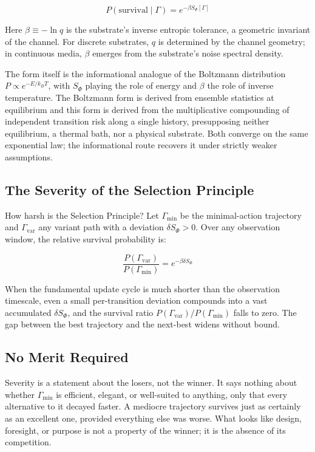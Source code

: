 \begin{equation}
\label{eq:survival_prob}
    P(\text{survival} \mid \Gamma) = e^{-\beta S_\Phi[\Gamma]}
\end{equation}

Here $\beta \equiv -\ln q$ is the substrate's inverse entropic tolerance, a geometric invariant of the channel. For discrete substrates, $q$ is determined by the channel geometry; in continuous media, $\beta$ emerges from the substrate's noise spectral density.

The form itself is the informational analogue of the Boltzmann distribution $P \propto e^{-E/k_BT}$, with $S_\Phi$ playing the role of energy and $\beta$ the role of inverse temperature. The Boltzmann form is derived from ensemble statistics at equilibrium and this form is derived from the multiplicative compounding of independent transition risk along a single history, presupposing neither equilibrium, a thermal bath, nor a physical substrate. Both converge on the same exponential law; the informational route recovers it under strictly weaker assumptions.

\subsection{The Severity of the Selection Principle}
\label{subsec:severity}

How harsh is the Selection Principle? Let $\Gamma_{\text{min}}$ be the minimal-action trajectory and $\Gamma_{\text{var}}$ any variant path with a deviation $\delta S_\Phi > 0$. Over any observation window, the relative survival probability is:

\begin{equation}
\label{eq:severity}
    \frac{P(\Gamma_{\text{var}})}{P(\Gamma_{\text{min}})} = e^{-\beta \delta S_\Phi}
\end{equation}

When the fundamental update cycle is much shorter than the observation timescale, even a small per-transition deviation compounds into a vast accumulated $\delta S_\Phi$, and the survival ratio $P(\Gamma_{\text{var}})/P(\Gamma_{\text{min}})$ falls to zero. The gap between the best trajectory and the next-best widens without bound.

\subsection{No Merit Required}
\label{subsec:teleology}
Severity is a statement about the losers, not the winner. It says nothing about whether $\Gamma_{\text{min}}$ is efficient, elegant, or well-suited to anything, only that every alternative to it decayed faster. A mediocre trajectory survives just as certainly as an excellent one, provided everything else was worse. What looks like design, foresight, or purpose is not a property of the winner; it is the absence of its competition.


